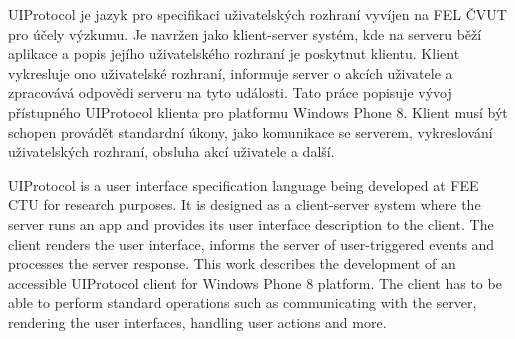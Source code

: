\startAbstractCz
UIProtocol je jazyk pro specifikaci uživatelských rozhraní vyvíjen na FEL ČVUT pro účely výzkumu. Je navržen jako klient-server systém, kde na serveru běží aplikace a popis jejího uživatelského rozhraní je poskytnut klientu. Klient vykresluje ono uživatelské rozhraní, informuje server o akcích uživatele a zpracovává odpovědi serveru na tyto události. Tato práce popisuje vývoj přístupného UIProtocol klienta pro platformu Windows Phone 8. Klient musí být schopen provádět standardní úkony, jako komunikace se serverem, vykreslování uživatelských rozhraní, obsluha akcí uživatele a další.
\stopAbstractCz

\startAbstractEn
UIProtocol is a user interface specification language being developed at FEE CTU for research purposes. It is designed as a client-server system where the server runs an app and provides its user interface description to the client. The client renders the user interface, informs the server of user-triggered events and processes the server response. This work describes the development of an accessible UIProtocol client for Windows Phone 8 platform. The client has to be able to perform standard operations such as communicating with the server, rendering the user interfaces, handling user actions and more.
\stopAbstractEn

\endinput
